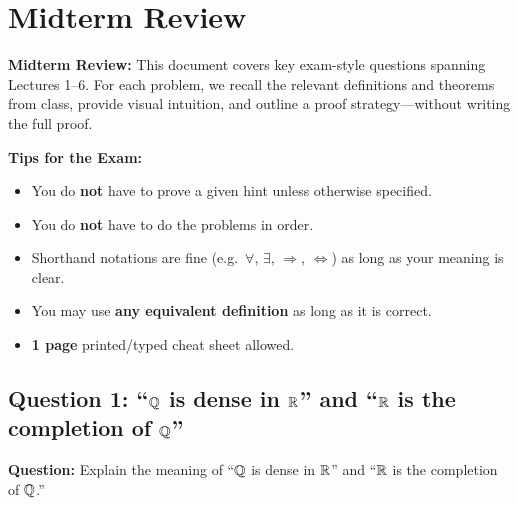 \documentclass[../master/master.tex]{subfiles}
\begin{document}
\renewcommand{\lecturenum}{R}
\renewcommand{\lecturedate}{Spring 2026}
\renewcommand{\lecturetopic}{Midterm Review}

\section{Midterm Review}

\begin{lecturesummary}
\textbf{Midterm Review:} This document covers key exam-style questions spanning Lectures 1--6. For each problem, we recall the relevant definitions and theorems from class, provide visual intuition, and outline a proof strategy---without writing the full proof.
\end{lecturesummary}

\begin{notebox}
\textbf{Tips for the Exam:}
\begin{itemize}
    \item You do \textbf{not} have to prove a given hint unless otherwise specified.
    \item You do \textbf{not} have to do the problems in order.
    \item Shorthand notations are fine (e.g.\ $\forall$, $\exists$, $\Rightarrow$, $\Leftrightarrow$) as long as your meaning is clear.
    \item You may use \textbf{any equivalent definition} as long as it is correct.
    \item \textbf{1 page} printed/typed cheat sheet allowed.
\end{itemize}
\end{notebox}

\subsection{Question 1: ``$\mathbb{Q}$ is dense in $\mathbb{R}$'' and ``$\mathbb{R}$ is the completion of $\mathbb{Q}$''}

\begin{summarybox}
\textbf{Question:} Explain the meaning of ``$\mathbb{Q}$ is dense in $\mathbb{R}$'' and ``$\mathbb{R}$ is the completion of $\mathbb{Q}$.''
\end{summarybox}
\end{document}
